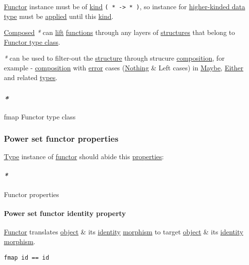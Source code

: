 \documentclass[a4paper,14pt,oneside]{book}
\begin{document}
\hyperref[org3bd25a7]{Functor} instance must be of \hyperref[org9173944]{kind} \texttt{( * -> * )}, so instance for \hyperref[orge85ecd9]{higher-kinded data type} must be \hyperref[org62ff122]{applied} until this \hyperref[org9173944]{kind}.

\hyperref[org243c274]{Composed} \emph{*} can \hyperref[org8b2b23f]{lift} \hyperref[org9766947]{functions} through any layers of \hyperref[orgde3d251]{structures} that belong to \hyperref[org9241fac]{Functor type class}.

\emph{*} can be used to filter-out the \hyperref[org3025fd4]{structure} through strucure \hyperref[org6a6c663]{composition}, for example - \hyperref[org6a6c663]{composition} with \hyperref[org03989bd]{error} cases (\hyperref[org9d4f9d1]{Nothing} \& Left cases) in \hyperref[org798cb1c]{Maybe}, \hyperref[org3db828c]{Either} and related \hyperref[org40b6d66]{types}.

\subsubsection{\emph{*}}
\label{sec:orga3c5f4a}

\label{org98aa9f1}fmap
\label{org9241fac}Functor type class

\subsubsection{\label{orgdfcf212}Power set functor properties}
\label{sec:orge7f902c}
\hyperref[org4e3af4c]{Type} instance of \hyperref[org3bd25a7]{functor} should abide this \hyperref[org8cc685d]{properties}:

\paragraph{\emph{*}}
\label{sec:org1ee4e38}

\label{org849cfaf}Functor properties

\paragraph{\label{orga97ef8e}Power set functor identity property}
\label{sec:org000d84b}
\hyperref[org3bd25a7]{Functor} translates \hyperref[orgd191004]{object} \& its \hyperref[org6fea37f]{identity} \hyperref[orge736ce1]{morphism} to target \hyperref[orgd191004]{object} \& its \hyperref[org6fea37f]{identity} \hyperref[orge736ce1]{morphism}.

\begin{verbatim}
fmap id == id
\end{verbatim}
\end{document}
